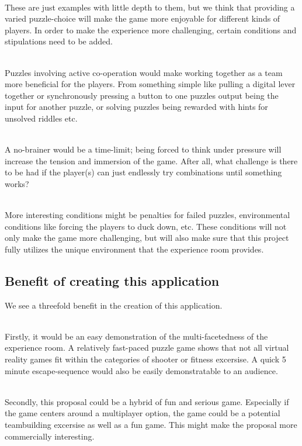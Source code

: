 \documentclass[11pt]{article}
\begin{document}
~\\
These are just examples with little depth to them, but we think that providing a varied puzzle-choice will make the game more enjoyable for different kinds of players. In order to make the experience more challenging, certain conditions and stipulations need to be added. 

~\\
Puzzles involving active co-operation would make working together as a team more beneficial for the players. From something simple like pulling a digital lever together or synchronously pressing a button to one puzzles output being the input for another puzzle, or solving puzzles being rewarded with hints for unsolved riddles etc. 

~\\
A no-brainer would be a time-limit; being forced to think under pressure will increase the tension and immersion of the game. After all, what challenge is there to be had if the player(s) can just endlessly try combinations until something works?

~\\
\newpage
More interesting conditions might be penalties for failed puzzles, environmental conditions like forcing the players to duck down, etc. These conditions will not only make the game more challenging, but will also make sure that this project fully utilizes the unique environment that the experience room provides.


\newpage
{}
\subsection*{Benefit of creating this application}
We see a threefold benefit in the creation of this application. 

~\\
Firstly, it would be an easy demonstration of the multi-facetedness of the experience room. A relatively fast-paced puzzle game shows that not all virtual reality games fit within the categories of shooter or fitness excersise. A quick 5 minute escape-sequence would also be easily demonstratable to an audience.

~\\
Secondly, this proposal could be a hybrid of fun and serious game. Especially if the game centers around a multiplayer option, the game could be a potential teambuilding excersise as well as a fun game. This might make the proposal more commercially interesting.
\end{document}

